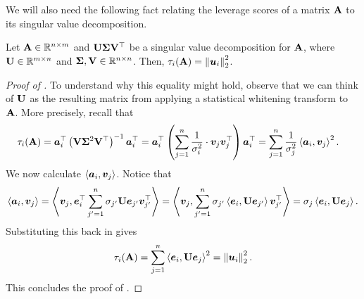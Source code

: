 \documentclass[11pt]{article}
\numberwithin{equation}{section}
\begin{document}

We will also need the following fact relating the leverage scores of a matrix $\mathbf{A}$ to its singular value decomposition.

\begin{fact}
\label{fact:whitening}
Let $\mathbf{A}\in\mathbb{R}^{n\times m}$ and $\mathbf{U}\mathbf{\Sigma}\mathbf{V}^{\top}$ be a singular value decomposition for $\mathbf{A}$, where $\mathbf{U}\in\mathbb{R}^{m\times n}$ and $\mathbf{\Sigma},\mathbf{V}\in\mathbb{R}^{n\times n}$. Then, $\tau_i(\mathbf{A}) = \left\lVert \bm{u}_i \right\rVert_2^2$.
\end{fact}
\begin{proof}[Proof of ]
To understand why this equality might hold, observe that we can think of $\mathbf{U}$ as the resulting matrix from applying a statistical whitening transform to $\mathbf{A}$. More precisely, recall that
\begin{align*}
    \tau_i(\mathbf{A}) &= \bm{a}_i^{\top} \left(\mathbf{V}\mathbf{\Sigma}^2\mathbf{V}^{\top}\right)^{-1}\bm{a}_i^{\top} = \bm{a}_i^{\top}\left(\sum_{j=1}^n \frac{1}{\sigma_i^2} \cdot \bm{v}_j\bm{v}_j^{\top}\right)\bm{a}_i^{\top} = \sum_{j=1}^n \frac{1}{\sigma_j^2}\left\langle \bm{a}_i,\bm{v}_j \right\rangle^2.
\end{align*}
We now calculate $\left\langle \bm{a}_i,\bm{v}_j \right\rangle$. Notice that
\begin{align*}
    \left\langle \bm{a}_i,\bm{v}_j \right\rangle = \left\langle \bm{v}_j, \bm{e}_i^{\top}\sum_{j'=1}^n \sigma_{j'}\mathbf{U}\bm{e}_{j'}\bm{v}_{j'}^{\top} \right\rangle = \left\langle \bm{v}_j, \sum_{j'=1}^n \sigma_{j'}\left\langle \bm{e}_i,\mathbf{U}\bm{e}_{j'} \right\rangle\bm{v}_{j'}^{\top} \right\rangle = \sigma_{j}\left\langle \bm{e}_i,\mathbf{U}\bm{e}_j \right\rangle.
\end{align*}
Substituting this back in gives
\begin{align*}
    \tau_i(\mathbf{A}) = \sum_{j=1}^n \left\langle \bm{e}_i,\mathbf{U}\bm{e}_j \right\rangle^2 = \left\lVert \bm{u}_i \right\rVert_2^2.
\end{align*}
This concludes the proof of .
\end{proof}
\end{document}

